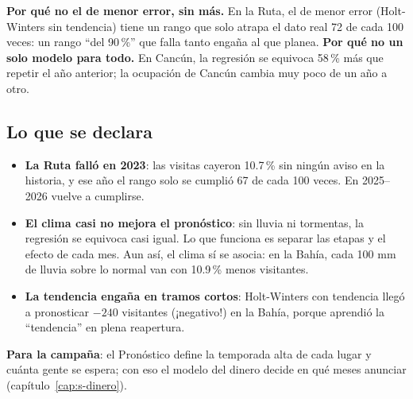 \begin{porque}
\textbf{Por qué no el de menor error, sin más.} En la Ruta, el de menor error (Holt-Winters sin tendencia) tiene un rango
que solo atrapa el dato real 72 de cada 100 veces: un rango ``del 90\,\%'' que falla tanto engaña al que planea.
\textbf{Por qué no un solo modelo para todo.} En Cancún, la regresión se equivoca 58\,\% más que repetir el año anterior;
la ocupación de Cancún cambia muy poco de un año a otro.
\end{porque}

\subsection{Lo que se declara}
\begin{itemize}
\item \textbf{La Ruta falló en 2023}: las visitas cayeron 10.7\,\% sin ningún aviso en la historia, y ese año el rango solo
  se cumplió 67 de cada 100 veces. En 2025–2026 vuelve a cumplirse.
\item \textbf{El clima casi no mejora el pronóstico}: sin lluvia ni tormentas, la regresión se equivoca casi igual. Lo que
  funciona es separar las etapas y el efecto de cada mes. Aun así, el clima sí se asocia: en la Bahía, cada 100 mm de
  lluvia sobre lo normal van con 10.9\,\% menos visitantes.
\item \textbf{La tendencia engaña en tramos cortos}: Holt-Winters con tendencia llegó a pronosticar $-240$ visitantes
  (¡negativo!) en la Bahía, porque aprendió la ``tendencia'' en plena reapertura.
\end{itemize}

\textbf{Para la campaña}: el Pronóstico define la temporada alta de cada lugar y cuánta gente se espera; con eso el
modelo del dinero decide en qué meses anunciar (capítulo~\ref{cap:s-dinero}).
